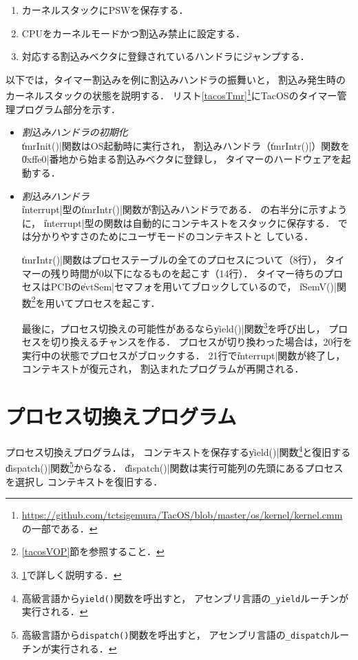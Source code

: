 \begin{enumerate}
\item カーネルスタックにPSWを保存する．
\item CPUをカーネルモードかつ割込み禁止に設定する．
\item 対応する割込みベクタに登録されているハンドラにジャンプする．
\end{enumerate}

以下では，タイマー割込みを例に割込みハンドラの振舞いと，
割込み発生時のカーネルスタックの状態を説明する．
リスト\ref{tacosTmr}\footnote{
  \url{https://github.com/tctsigemura/TacOS/blob/master/os/kernel/kernel.cmm}
  の一部である．
}にTacOSのタイマー管理プログラム部分を示す．



\begin{itemize}
\item \emph{割込みハンドラの初期化} \\
  \|tmrInit()|関数はOS起動時に実行され，
  割込みハンドラ（\|tmrIntr()|）関数を
  \|0xffe0|番地から始まる割込みベクタに登録し，
  タイマーのハードウェアを起動する．
\item \emph{割込みハンドラ} \\
  \|interrupt|型の\|tmrIntr()|関数が割込みハンドラである．
  の右半分に示すように，
  \|interrupt|型の関数は自動的にコンテキストをスタックに保存する．
  では分かりやすさのためにユーザモードのコンテキストと
  している．

  \|tmrIntr()|関数はプロセステーブルの全てのプロセスについて（8行），
  タイマーの残り時間が0以下になるものを起こす（14行）．
  タイマー待ちのプロセスはPCBの\|evtSem|セマフォを用いてブロックしているので，
  \|iSemV()|関数\footnote{
    \ref{tacosVOP}節を参照すること．
  }を用いてプロセスを起こす．

  最後に，プロセス切換えの可能性があるなら\|yield()|関数\footnote{
    \ref{tacosProcSwitch}で詳しく説明する．
  }を呼び出し，
  プロセスを切り換えるチャンスを作る．
  プロセスが切り換わった場合は，20行を実行中の状態でプロセスがブロックする．
  21行で\|interrupt|関数が終了し，コンテキストが復元され，
  割込まれたプログラムが再開される．
\end{itemize}

\section{プロセス切換えプログラム}
\label{tacosProcSwitch}
プロセス切換えプログラムは，
コンテキストを保存する\|yield()|関数\footnote{
  高級言語から\texttt{yield()}関数を呼出すと，
  アセンブリ言語の\texttt{\_yield}ルーチンが実行される．
}と復旧する\|dispatch()|関数\footnote{
  高級言語から\texttt{dispatch()}関数を呼出すと，
  アセンブリ言語の\texttt{\_dispatch}ルーチンが実行される．
}からなる．
\|dispatch()|関数は実行可能列の先頭にあるプロセスを選択し
コンテキストを復旧する．

